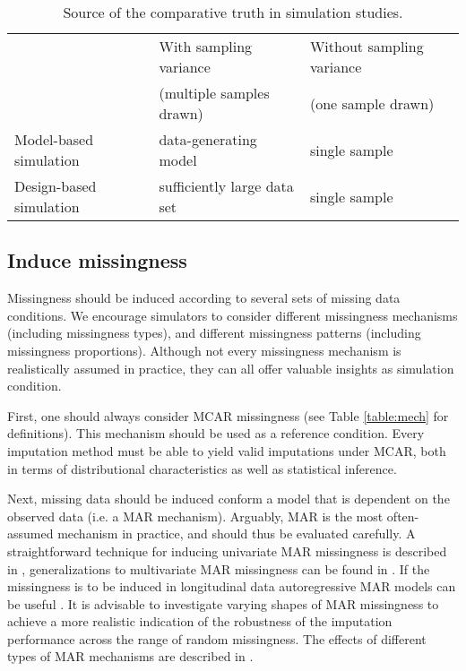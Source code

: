 \documentclass[bimj,fleqn]{w-art}
\begin{document}
\begin{table}[tb]
\begin{center}
\caption{Source of the comparative truth in simulation studies.}
\label{table:dgm_truth}
\begin{tabular}{lll}
\hline
               & With sampling variance      & Without sampling variance \\
               & (multiple samples drawn)    & (one sample drawn) \\
\hline  
Model-based simulation   & data-generating model         & single sample \\
Design-based simulation  & sufficiently large data set   & single sample \\
\hline
\end{tabular}
\end{center}
\end{table}


\subsection{Induce missingness}


Missingness should be induced according to several sets of missing data conditions. We encourage simulators to consider different missingness mechanisms (including missingness types), and different missingness patterns (including missingness proportions). Although not every missingness mechanism is realistically assumed in practice, they can all offer valuable insights as simulation condition. 

First, one should always consider MCAR missingness (see Table \ref{table:mech} for definitions). This mechanism should be used as a reference condition. Every imputation method must be able to yield valid imputations under MCAR, both in terms of distributional characteristics as well as statistical inference.

Next, missing data should be induced conform a model that is dependent on the observed data (i.e. a MAR mechanism). Arguably, MAR is the most often-assumed mechanism in practice, and should thus be evaluated carefully. A straightforward technique for inducing univariate MAR missingness is described in \citet[][\S 3.2.4]{buur18}, generalizations to multivariate MAR missingness can be found in \citet{ampute}. If the missingness is to be induced in longitudinal data autoregressive MAR models can be useful \citep[see e.g.][model 2 and model 3]{shara2015randomly}. It is advisable to investigate varying shapes of MAR missingness to achieve a more realistic indication of the robustness of the imputation performance across the range of random missingness. The effects of different types of MAR mechanisms are described in \citet{scho18}.
\end{document}
